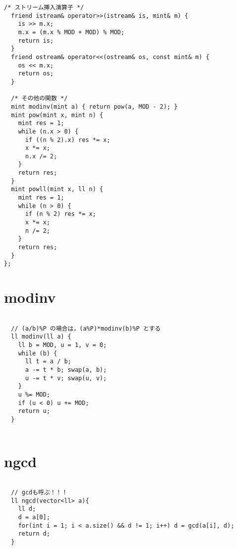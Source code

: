 \documentclass{jsarticle}
\begin{document}
\begin{lstlisting}[caption=modint]
  /* ストリーム挿入演算子 */
  friend istream& operator>>(istream& is, mint& m) {
    is >> m.x;
    m.x = (m.x % MOD + MOD) % MOD;
    return is;
  }
  friend ostream& operator<<(ostream& os, const mint& m) {
    os << m.x;
    return os;
  }

  /* その他の関数 */
  mint modinv(mint a) { return pow(a, MOD - 2); }
  mint pow(mint x, mint n) {
    mint res = 1;
    while (n.x > 0) {
      if ((n % 2).x) res *= x;
      x *= x;
      n.x /= 2;
    }
    return res;
  }
  mint powll(mint x, ll n) {
    mint res = 1;
    while (n > 0) {
      if (n % 2) res *= x;
      x *= x;
      n /= 2;
    }
    return res;
  }
};

\end{lstlisting}

\color{white}
\section{modinv}
\color{black}
\begin{lstlisting}[caption=modinv]

  // (a/b)%P の場合は，(a%P)*modinv(b)%P とする
  ll modinv(ll a) {
    ll b = MOD, u = 1, v = 0;
    while (b) {
      ll t = a / b;
      a -= t * b; swap(a, b);
      u -= t * v; swap(u, v);
    }
    u %= MOD;
    if (u < 0) u += MOD;
    return u;
  }
  

\end{lstlisting}

\color{white}
\section{ngcd}
\color{black}
\begin{lstlisting}[caption=ngcd]

  // gcdも呼ぶ！！！
  ll ngcd(vector<ll> a){
    ll d;
    d = a[0];
    for(int i = 1; i < a.size() && d != 1; i++) d = gcd(a[i], d);
    return d;
  }
  

\end{lstlisting}

\color{white}
\end{document}

